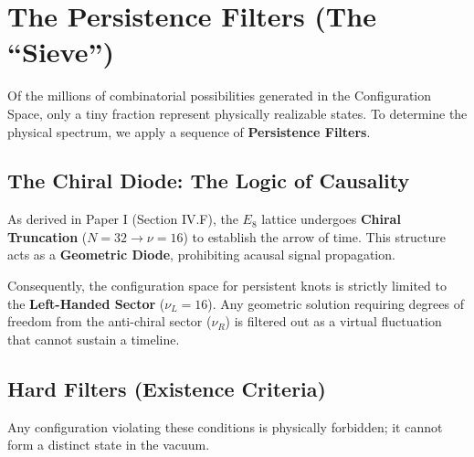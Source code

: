 \section*{The Persistence Filters (The ``Sieve'')}

Of the millions of combinatorial possibilities generated in the Configuration Space, only a tiny fraction represent physically realizable states. To determine the physical spectrum, we apply a sequence of \textbf{Persistence Filters}.

\subsection*{The Chiral Diode: The Logic of Causality}

As derived in Paper I (Section IV.F), the $E_8$ lattice undergoes \textbf{Chiral Truncation} ($N=32 \to \nu=16$) to establish the arrow of time. This structure acts as a \textbf{Geometric Diode}, prohibiting acausal signal propagation.

Consequently, the configuration space for persistent knots is strictly limited to the \textbf{Left-Handed Sector} ($\nu_L=16$). Any geometric solution requiring degrees of freedom from the anti-chiral sector ($\nu_R$) is filtered out as a virtual fluctuation that cannot sustain a timeline.

\subsection*{Hard Filters (Existence Criteria)}

Any configuration violating these conditions is physically forbidden; it cannot form a distinct state in the vacuum.

